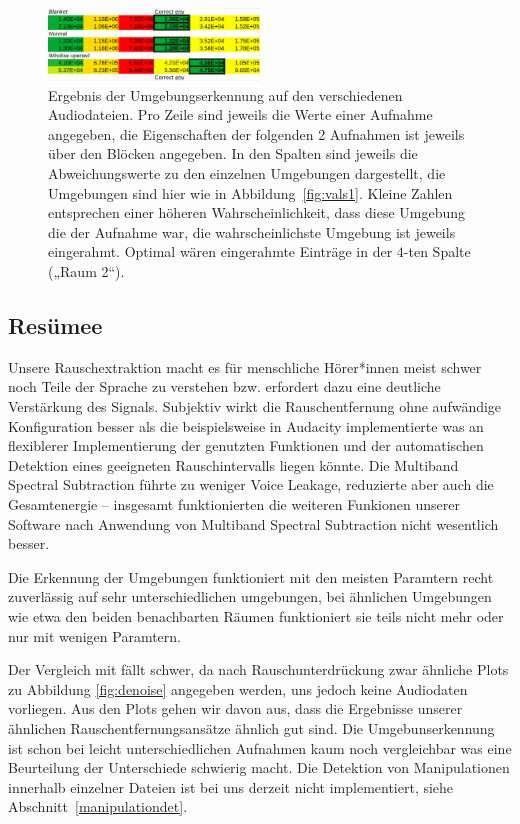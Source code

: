 \documentclass[
	fontsize=10.5pt,
	marginpar=false,
	ngerman,
	accentcolor=3d
	]{tudapub}
\begin{document}
\begin{figure}[h]
	\centering
	\includegraphics[width=0.5\textwidth]{media/vals1}
	\caption{Ergebnis der Umgebungserkennung auf den verschiedenen Audiodateien. Pro Zeile sind jeweils die Werte einer Aufnahme angegeben, die Eigenschaften der folgenden 2 Aufnahmen ist jeweils über den Blöcken angegeben. In den Spalten sind jeweils die Abweichungswerte zu den einzelnen Umgebungen dargestellt, die Umgebungen sind hier wie in Abbildung~\ref{fig:vals1}. Kleine Zahlen entsprechen einer höheren Wahrscheinlichkeit, dass diese Umgebung die der Aufnahme war, die wahrscheinlichste Umgebung ist jeweils eingerahmt. Optimal wären eingerahmte Einträge in der $4$-ten Spalte („Raum 2“).}
	\label{fig:vals2}
\end{figure}


\subsection{Resümee}

Unsere Rauschextraktion macht es für menschliche Hörer*innen meist schwer noch Teile der Sprache zu verstehen bzw. erfordert dazu eine deutliche Verstärkung des Signals. Subjektiv wirkt die Rauschentfernung ohne aufwändige Konfiguration besser als die beispielsweise in Audacity \cite{audacity_audacity_nodate} implementierte was an flexiblerer Implementierung der genutzten Funktionen und der automatischen Detektion eines geeigneten Rauschintervalls liegen könnte. Die Multiband Spectral Subtraction führte zu weniger Voice Leakage, reduzierte aber auch die Gesamtenergie – insgesamt funktionierten die weiteren Funkionen unserer Software nach Anwendung von Multiband Spectral Subtraction nicht wesentlich besser.

Die Erkennung der Umgebungen funktioniert mit den meisten Paramtern recht zuverlässig auf sehr unterschiedlichen umgebungen, bei ähnlichen Umgebungen wie etwa den beiden benachbarten Räumen funktioniert sie teils nicht mehr oder nur mit wenigen Paramtern.

Der Vergleich mit \cite{ikram_digital_2010} fällt schwer, da nach Rauschunterdrückung zwar ähnliche Plots zu Abbildung \ref{fig:denoise} angegeben werden, uns jedoch keine Audiodaten vorliegen. Aus den Plots gehen wir davon aus, dass die Ergebnisse unserer ähnlichen Rauschentfernungsansätze ähnlich gut sind. Die Umgebunserkennung ist schon bei leicht unterschiedlichen Aufnahmen kaum noch vergleichbar was eine Beurteilung der Unterschiede schwierig macht. Die Detektion von Manipulationen innerhalb einzelner Dateien ist bei uns derzeit nicht implementiert, siehe Abschnitt~\ref{manipulationdet}.
\end{document}
